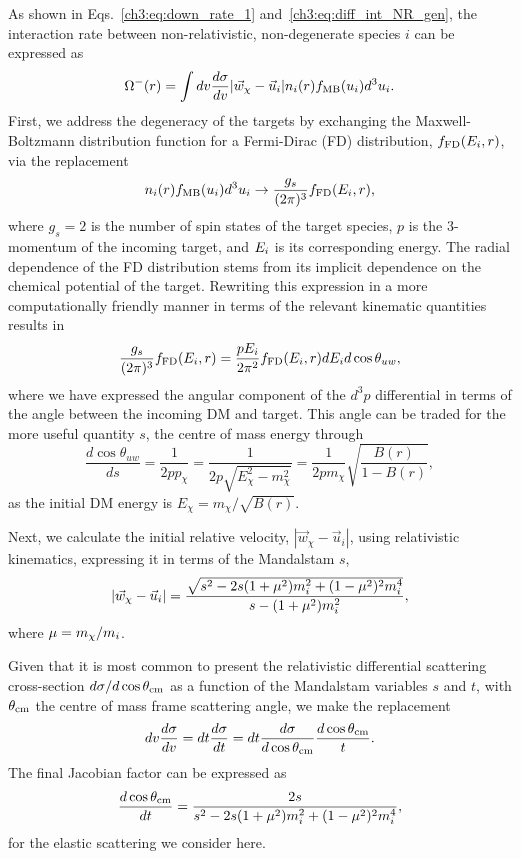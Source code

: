 As shown in Eqs.~\ref{ch3:eq:down_rate_1} and~\ref{ch3:eq:diff_int_NR_gen}, the interaction rate between non-relativistic, non-degenerate species $i$ can be expressed as
\begin{equation}
    \Omega^{-}(r) = \int dv \frac{d\sigma}{dv} |\vec{w}_\chi -\vec{u}_i| n_i(r) f_{\rm MB}(u_i)d^3u_i.
    \label{ch3:eq:NR_int_rate_simple}
\end{equation}
First, we address the degeneracy of the targets by exchanging the Maxwell-Boltzmann distribution function for a Fermi-Dirac (FD) distribution, $f_{\rm FD}(E_i,r)$, via the replacement
\begin{equation}
    n_i(r) f_{\rm MB}(u_i)d^3 u_i \rightarrow \frac{g_s}{(2\pi)^3}f_{\rm FD}(E_i, r),
    \label{ch3:eq:number_density_replacement}
\end{equation}
where $g_s = 2$ is the number of spin states of the target species, $p$ is the 3-momentum of the incoming target, and $E_i$ is its corresponding energy. The radial dependence of the FD distribution stems from its implicit dependence on the chemical potential of the target. Rewriting this expression in a more computationally friendly manner in terms of the relevant kinematic quantities results in 
\begin{equation}
    \frac{g_s}{(2\pi)^3}f_{\rm FD}(E_i, r) = \frac{p E_i}{2\pi^2}f_{\rm FD}(E_i, r) dE_i d\cos\theta_{uw},
    \label{ch3:eq:free_Fermi_number}
\end{equation}
where we have expressed the angular component of the $d^3 p$ differential in terms of the angle between the incoming DM and target. This angle can be traded for the more useful quantity $s$, the centre of mass energy through
\begin{equation}
    \frac{d\cos\theta_{uw}}{ds} = \frac{1}{2 p p_\chi} = \frac{1}{2 p \sqrt{E_\chi^2 - m_\chi^2}} = \frac{1}{2 p m_\chi}\sqrt{\frac{B(r)}{1 - B(r)}},
\end{equation}
as the initial DM energy is $E_\chi = m_\chi/\sqrt{B(r)}$.

Next, we calculate the initial relative velocity, $|\vec{w}_\chi -\vec{u}_i|$, using relativistic kinematics, expressing it in terms of the Mandalstam $s$, 
\begin{equation}
    |\vec{w}_\chi -\vec{u}_i| = \frac{\sqrt{s^2 - 2 s (1 + \mu^2)m_i^2 + (1 - \mu^2)^2 m_i^4}}{s - (1 + \mu^2) m_i^2},
\end{equation}
where $\mu = m_\chi/m_i$.

Given that it is most common to present the relativistic differential scattering cross-section $d\sigma/d\cos\theta_\mathrm{cm}$ as a function of the Mandalstam variables $s$ and $t$, with $\theta_\mathrm{cm}$ the centre of mass frame scattering angle, we make the replacement
\begin{equation}
    dv \frac{d\sigma}{dv} = dt\frac{d\sigma}{dt} = dt \frac{d\sigma}{d\cos\theta_\mathrm{cm}}\frac{d\cos\theta_\mathrm{cm}}{t}.
\end{equation}
The final Jacobian factor can be expressed as
\begin{equation}
    \frac{d\cos\theta_\mathrm{cm}}{dt} = \frac{2s}{s^2 - 2 s (1 + \mu^2)m_i^2 + (1 - \mu^2)^2 m_i^4},
\end{equation}
for the elastic scattering we consider here.

